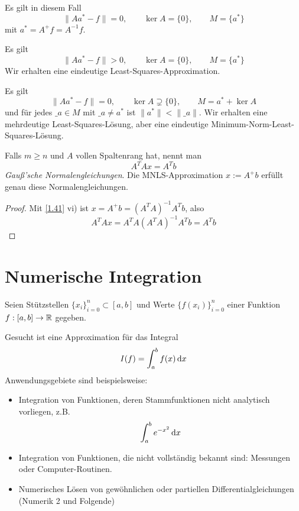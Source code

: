 \documentclass[
]{mycourse}
\begin{document}
\begin{seg}[$m=n$ (Polynominterpolation)]
	Es gilt in diesem Fall
	\[
		\|Aa^*-f\| = 0, \qquad \ker A = \{0\}, \qquad M = \{a^*\}
	\]
	mit $a^* = A^+f = A^{-1}f$.
\end{seg}
\begin{seg}[$m>n$]
	Es gilt
	\[
		\|Aa^*-f\| > 0, \qquad \ker A = \{0\}, \qquad M = \{a^*\}
	\]
	Wir erhalten eine eindeutige Least-Squares-Approximation.
\end{seg}
\begin{seg}[$m<n$]
	Es gilt
	\[
		\|Aa^*-f\| = 0, \qquad \ker A \supsetneq \{0\}, \qquad M = a^* + \ker A
	\]
	und für jedes $\_a \in M$ mit $\_a \neq a^*$ ist $\|a^*\| < \|\_a\|$.
	Wir erhalten eine mehrdeutige Least-Squares-Lösung, aber eine eindeutige Minimum-Norm-Least-Squares-Lösung.
\end{seg}
\begin{nt*}
	Falls $m\ge n$ und $A$ vollen Spaltenrang hat, nennt man
	\[
		A^TAx = A^Tb
	\]
	\emph{Gauß'sche Normalengleichungen}.
	Die MNLS-Approximation $x:=A^+b$ erfüllt genau diese Normalengleichungen.
	\begin{proof}
		Mit \ref{1.41} vi) ist $x=A^+b = (A^TA)^{-1}A^Tb$, also
		\[
			A^TAx = A^TA(A^TA)^{-1}A^T b = A^Tb
		\]
	\end{proof}
\end{nt*}



\chapter{Numerische Integration}	



Seien Stützstellen $\{x_i\}_{i=0}^n \subset [a,b]$ und Werte $\{f(x_i)\}_{i=0}^n$ einer Funktion $f:[a,b]\to \mathbb{R}$ gegeben.

Gesucht ist eine Approximation für das Integral
\[
	I(f) = \int_a^b f(x) \,\mathrm{d}x
\]
Anwendungsgebiete sind beispielsweise:
\begin{itemize}
	\item
		Integration von Funktionen, deren Stammfunktionen nicht analytisch vorliegen, z.B.
		\[
			\int_a^b e^{-x^2} \,\mathrm{d}x
		\]
	\item
		Integration von Funktionen, die nicht vollständig bekannt sind: Messungen oder Computer-Routinen.
	\item
		Numerisches Lösen von gewöhnlichen oder partiellen Differentialgleichungen (Numerik 2 und Folgende)
\end{itemize}
\end{document}
